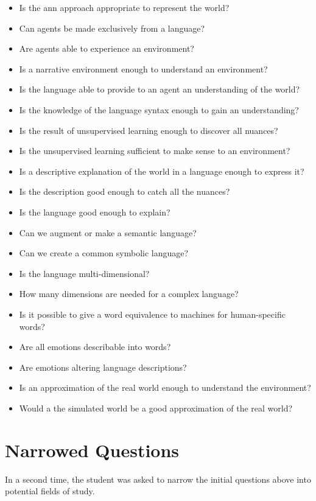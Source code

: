 \begin{itemize}[noitemsep]
    \item Is the \gls{ann} approach appropriate to represent the world?
    \item Can agents be made exclusively from a language?
    \item Are agents able to experience an environment?
    \item Is a narrative environment enough to understand an environment?
    \item Is the language able to provide to an agent an understanding of the world?
    \item Is the knowledge of the language syntax enough to gain an understanding?
    \item Is the result of unsupervised learning enough to discover all nuances?
    \item Is the unsupervised learning sufficient to make sense to an environment?
    \item Is a descriptive explanation of the world in a language enough to express it?
    \item Is the description good enough to catch all the nuances?
    \item Is the language good enough to explain?
    \item Can we augment or make a semantic language?
    \item Can we create a common symbolic language?
    \item Is the language multi-dimensional?
    \item How many dimensions are needed for a complex language?
    \item Is it possible to give a word equivalence to machines for human-specific words?
    \item Are all emotions describable into words?
    \item Are emotions altering language descriptions?
    \item Is an approximation of the real world enough to understand the environment?
    \item Would a the simulated world be a good approximation of the real world?
\end{itemize}

\section{Narrowed Questions}
In a second time, the student was asked to narrow the initial questions above into potential fields of study.

